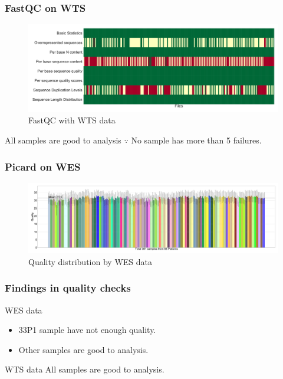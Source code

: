 \documentclass{beamer}
\begin{document}
            \begin{frame}
                \frametitle{FastQC on WTS}

                \begin{figure}
                    \includegraphics[width=0.9 \linewidth]{figures/FastQC/FastQC_WTS.pdf}
                    \caption{FastQC with WTS data}
                \end{figure}

                \begin{exampleblock}{All samples are good to analysis}
                    $\because$ No sample has more than 5 failures.
                \end{exampleblock}
            \end{frame}

            \begin{frame}
                \frametitle{Picard on WES}

                \begin{figure}
                    \includegraphics[width=0.9 \linewidth]{figures/CollectMultipleMetrics/BWA.pdf}
                    \caption{Quality distribution by WES data}
                \end{figure}
            \end{frame}

            \begin{frame}
                \frametitle{Findings in quality checks}

                \begin{alertblock}{WES data}
                    \begin{itemize}
                        \item 33P1 sample have not enough quality.
                        \item Other samples are good to analysis.
                    \end{itemize}
                \end{alertblock}

                \begin{exampleblock}{WTS data}
                    All samples are good to analysis.
                \end{exampleblock}
            \end{frame}
\end{document}
